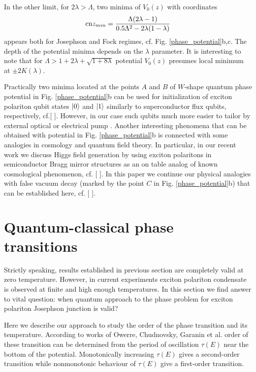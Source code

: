 \documentclass[aps, pre, preprint, groupedaddress, superscriptaddress, showkeys, showpacs] {revtex4-1}
\DeclarePairedDelimiter\ket{\lvert}{\rangle}
\begin{document}
In the other limit, for $2 \lambda > \Lambda$, two minima of $V_0(z)$ with coordinates
%
\begin{equation}
\textrm{cn}{z_{min}} = \frac{\Lambda (2 \lambda - 1)}{0.5 \Lambda^2 - 2 \lambda (1 - \lambda)}
\label{eq:z_minima}
\end{equation}
%
appears both for Josephson and Fock regimes, cf. Fig. \ref{phase_potential}b,c.  
The depth of the potential minima depends on the $\lambda$ parameter.
It is interesting to note that for {\red $\Lambda > 1 + 2\lambda + \sqrt{1 + 8\lambda}$} potential $V_0(z)$ presumes local minimum at {\red $\pm 2 K(\lambda)$}.

Practically two minima located at the points $A$ and $B$ of $W$-shape quantum phase potential in Fig. \ref{phase_potential}b can be used for initialization of exciton polariton qubit states $\ket{0}$ and $\ket{1}$ similarly to superconductor flux qubits, respectively, {\red cf.[ ]}.
However, in our case such qubits much more easier to tailor by external optical or electrical pump {\red [ ]}.
Another interesting phenomena that can be obtained with potential in Fig. \ref{phase_potential}b is connected with some analogies in cosmology and quantum field theory.
In particular, in our recent work {\red [ ]} we discuss Higgs field generation by using exciton polaritons in semiconductor Bragg mirror structures as an on table analog of known cosmological phenomenon, {\red cf. [ ]}.
In this paper we continue our physical analogies with false vacuum decay (marked by the point $C$ in Fig. \ref{phase_potential}b) that can be established here, {\red cf. [ ]}.

\section{Quantum-classical phase transitions \label{sec:quantum_classical}}

Strictly speaking, results established in previous section are completely valid at zero temperature.
However, in current experiments exciton polariton condensate is observed at finite and high enough temperatures.
In this section we find answer to vital question: when quantum approach to the phase problem for exciton polariton Josephson junction is valid?

Here we describe our approach to study the order of the phase transition and its temperature.
According to works of Owerre, Chudnovsky, Garanin et al. order of these transition can be determined from the period of oscillation $\tau(E)$ near the bottom of the potential.
Monotonically increasing $\tau(E)$ gives a second-order transition while nonmonotonic behaviour of $\tau(E)$ give a first-order transition.
\end{document}
